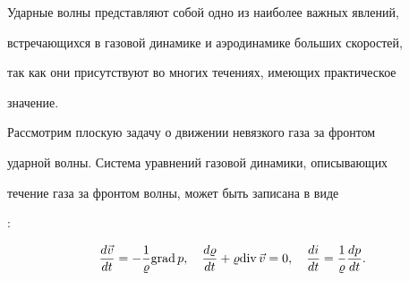 




\date{30/VII/2008} %























\maketitle





Ударные волны представляют собой одно из наиболее важных явлений,


встречающихся в газовой динамике и аэродинамике больших скоростей,


так как они присутствуют во многих течениях, имеющих практическое


значение.











Рассмотрим плоскую задачу о движении невязкого газа за фронтом


ударной волны. Система уравнений газовой динамики, описывающих


течение газа за фронтом волны, может быть записана в виде


\cite{Lunev}:


\begin{equation}


\frac{d\vec v}{dt}=- \frac{1}{\varrho} {\rm grad \,}  p, \quad


\frac{d\varrho}{dt} + \varrho {\rm div \,} \vec v = 0,\quad


\frac{di}{dt} = \frac{1}{\varrho} \frac{dp}{dt}.


\end{equation}


